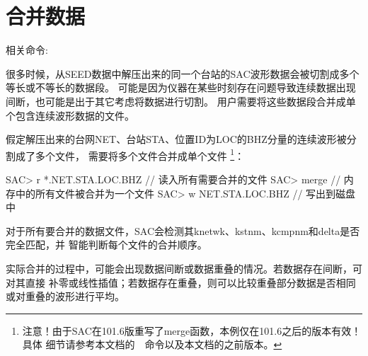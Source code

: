 \section{合并数据}
相关命令: 

很多时候，从SEED数据中解压出来的同一个台站的SAC波形数据会被切割成多个等长或不等长的数据段。
可能是因为仪器在某些时刻存在问题导致连续数据出现间断，也可能是出于其它考虑将数据进行切割。
用户需要将这些数据段合并成单个包含连续波形数据的文件。

假定解压出来的台网NET、台站STA、位置ID为LOC的BHZ分量的连续波形被分割成了多个文件，
需要将多个文件合并成单个文件
\footnote{注意！由于SAC在101.6版重写了merge函数，本例仅在101.6之后的版本有效！具体
细节请参考本文档的~~命令以及本文档的之前版本。}：

\begin{SACCode}
SAC> r *.NET.STA.LOC.BHZ        // 读入所有需要合并的文件
SAC> merge                      // 内存中的所有文件被合并为一个文件
SAC> w NET.STA.LOC.BHZ          // 写出到磁盘中
\end{SACCode}

对于所有要合并的数据文件，SAC会检测其knetwk、kstnm、kcmpnm和delta是否完全匹配，并
智能判断每个文件的合并顺序。

实际合并的过程中，可能会出现数据间断或数据重叠的情况。若数据存在间断，可对其直接
补零或线性插值；若数据存在重叠，则可以比较重叠部分数据是否相同或对重叠的波形进行平均。
